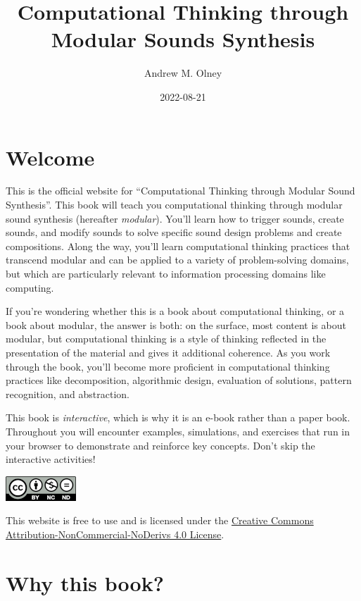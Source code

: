 \documentclass[
]{book}
\title{Computational Thinking through Modular Sounds Synthesis}
\author{Andrew M. Olney}
\date{2022-08-21}
\begin{document}
\maketitle

{
\setcounter{tocdepth}{1}
\tableofcontents
}
\hypertarget{welcome}{%
\chapter*{Welcome}\label{welcome}}

This is the official website for ``Computational Thinking through Modular Sound Synthesis''. This book will teach you computational thinking through modular sound synthesis (hereafter \emph{modular}). You'll learn how to trigger sounds, create sounds, and modify sounds to solve specific sound design problems and create compositions. Along the way, you'll learn computational thinking practices that transcend modular and can be applied to a variety of problem-solving domains, but which are particularly relevant to information processing domains like computing.

If you're wondering whether this is a book about computational thinking, or a book about modular, the answer is both: on the surface, most content is about modular, but computational thinking is a style of thinking reflected in the presentation of the material and gives it additional coherence. As you work through the book, you'll become more proficient in computational thinking practices like decomposition, algorithmic design, evaluation of solutions, pattern recognition, and abstraction.

This book is \emph{interactive}, which is why it is an e-book rather than a paper book. Throughout you will encounter examples, simulations, and exercises that run in your browser to demonstrate and reinforce key concepts. Don't skip the interactive activities!

\includegraphics{images/by-nc-nd.png}

This website is free to use and is licensed under the \href{https://creativecommons.org/licenses/by-nc-nd/4.0/}{Creative Commons Attribution-NonCommercial-NoDerivs 4.0 License}.

\hypertarget{why-this-book}{%
\chapter{Why this book?}\label{why-this-book}}
\end{document}
